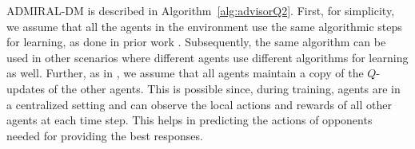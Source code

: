 \documentclass[jair, twoside,11pt,theapa]{article}
\begin{document}
\begin{algorithm}[t]
\end{algorithm}





ADMIRAL-DM is described in  Algorithm~\ref{alg:advisorQ2}. First, for simplicity, we  assume that all the agents in the environment use the same algorithmic steps for learning, as done in prior work \citep{hu2003nash}. Subsequently, the same algorithm can be used in other scenarios where different agents use different algorithms for learning as well. Further, as in \citet{hu2003nash}, we assume that all agents maintain a copy of the $Q$-updates of the other agents. This is possible since, during training, agents are in a centralized setting and can observe the local actions and rewards of all other agents at each time step. This helps in predicting the actions of opponents needed for providing the best responses. 
\end{document}
